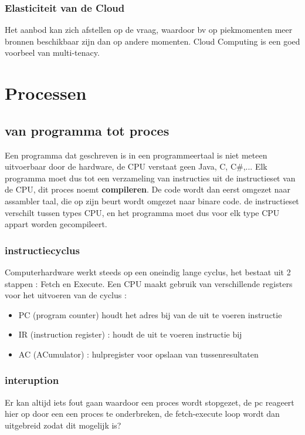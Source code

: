 \documentclass{report}
\begin{document}
   			\subsection{Elasticiteit van de Cloud}
   				Het aanbod kan zich afstellen op de vraag, waardoor bv op piekmomenten meer bronnen beschikbaar zijn dan op andere momenten. Cloud Computing is een goed voorbeel van multi-tenacy.
   	\chapter{Processen}
   		\section{van programma tot proces}
   			Een programma dat geschreven is in een programmeertaal is niet meteen uitvoerbaar door de hardware, de CPU verstaat geen Java, C, C\#,... Elk programma moet dus tot een verzameling van instructies uit de instructieset van de CPU, dit proces noemt \textbf{compileren}. De code wordt dan eerst omgezet naar assambler taal, die op zijn beurt wordt omgezet naar binare code. de instructieset verschilt tussen types CPU, en het programma moet dus voor elk type CPU appart worden gecompileert.
   			\subsection{instructiecyclus}
   				Computerhardware werkt steeds op een oneindig lange cyclus, het bestaat uit 2 stappen : Fetch en Execute.
   				Een CPU maakt gebruik van verschillende registers voor het uitvoeren van de cyclus : 
   				\begin{itemize}
   					\item PC (program counter) houdt het adres bij van de uit te voeren instructie
   					\item IR (instruction register) : houdt de uit te voeren instructie bij
   					\item  AC (ACumulator) : hulpregister voor opslaan van tussenresultaten
   				\end{itemize}
   			\subsection{interuption}
   				Er kan altijd iets fout gaan waardoor een proces wordt stopgezet, de pc reageert hier op door een een proces te onderbreken, de fetch-execute loop wordt dan uitgebreid zodat dit mogelijk is? 
\end{document}
